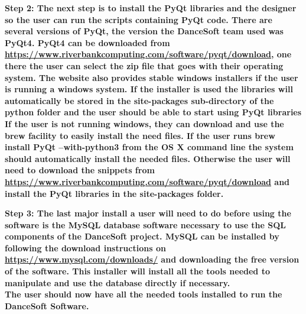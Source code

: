 \bf Step 2: \rm
	The next step is to install the PyQt libraries and the designer so the user can run the scripts containing PyQt code. There are several versions of PyQt, the version the DanceSoft team used was PyQt4. PyQt4 can be downloaded from \url{https://www.riverbankcomputing.com/software/pyqt/download}, one there the user can select the zip file that goes with their operating system. The website also provides stable windows installers if the user is running a windows system. If the installer is used the libraries will automatically be stored in the site-packages sub-directory of the python folder and the user should be able to start using PyQt libraries
	If the user is not running windows, they can download and use the brew facility to easily install the need files. If the user runs \bf brew install PyQt --with-python3 \rm from the OS X command line the system should automatically install the needed files.
	 Otherwise the user will need to download the snippets from \url{https://www.riverbankcomputing.com/software/pyqt/download} and install the PyQt libraries in the site-packages folder.
	 
\bf Step 3: \rm
	The last major install a user will need to do before using the software is the MySQL database software necessary to use the SQL components of the DanceSoft project.
	MySQL can be installed by following the download instructions on \url{https://www.mysql.com/downloads/} and downloading the free version of the software. This installer will install all the tools needed to manipulate and use the database directly if necessary.\\
	
The user should now have all the needed tools installed to run the DanceSoft Software.

